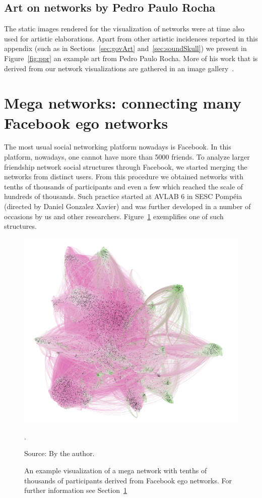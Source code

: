 \begin{apendicesenv}
	\subsection{Art on networks by Pedro Paulo Rocha}\label{sec:ppr}
	The static images rendered for the visualization of networks were at time also used for artistic elaborations.
	Apart from other artistic incidences reported in this appendix (such as in Sections~\ref{sec:govArt} and~\ref{sec:soundSkull})
	we present in Figure~\ref{fig:ppr} an example art from Pedro Paulo Rocha.
	More of his work that is derived from our network visualizations are gathered in an image gallery~\cite{pprGal}.
\section{Mega networks: connecting many Facebook ego networks}\label{sec:megarrede}
The most usual social networking platform nowadays is Facebook.
In this platform, nowadays, one cannot have more than 5000 friends.
To analyze larger friendship network social structures through Facebook,
we started merging the networks from distinct users.
From this procedure we obtained networks with tenths of thousands of participants
and even a few which reached the scale of hundreds of thousands.
Such practice started at AVLAB 6 in SESC Pompéia (directed by Daniel Gonzalez Xavier)
and was further developed in a number of occasions by us and other researchers.
Figure~\ref{fig:megarrede} exemplifies one of such structures.
\begin{figure}[h!]
\begin{center}
\includegraphics[scale=.45]{figs/megarrede}
\caption{An example visualization of a mega network with tenths of thousands of participants derived from Facebook ego networks.
	For further information see Section~\ref{sec:megarrede}}.
\label{fig:megarrede}
\begin{flushleft}\footnotesize
Source: By the author.\
\end{flushleft}
\end{center}
\end{figure}


\end{apendicesenv}
